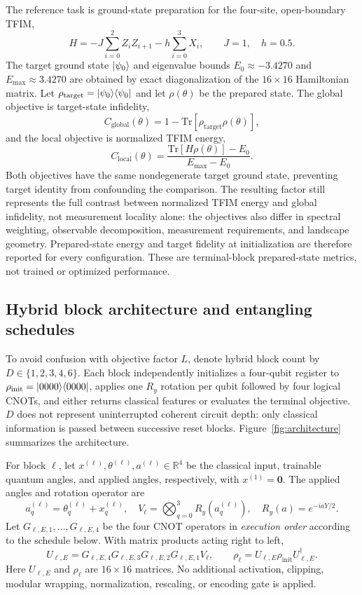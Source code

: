 \documentclass[pdflatex,sn-mathphys-num,Numbered]{sn-jnl}
\begin{document}
The reference task is ground-state preparation for the four-site, open-boundary TFIM,
\[
H=-J\sum_{i=0}^{2}Z_i Z_{i+1}-h\sum_{i=0}^{3}X_i,
\qquad J=1,\quad h=0.5.
\]
The target ground state $\ket{\psi_0}$ and eigenvalue bounds $E_0\approx-3.4270$ and $E_{\max}\approx3.4270$ are obtained by exact diagonalization of the $16\times16$ Hamiltonian matrix. Let $\rho_{\mathrm{target}}=\ket{\psi_0}\!\bra{\psi_0}$ and let $\rho(\theta)$ be the prepared state. The global objective is target-state infidelity,
\[
C_{\mathrm{global}}(\theta)
=1-\mathrm{Tr}[\rho_{\mathrm{target}}\rho(\theta)],
\]
and the local objective is normalized TFIM energy,
\[
C_{\mathrm{local}}(\theta)
=\frac{\mathrm{Tr}[H\rho(\theta)]-E_0}{E_{\max}-E_0}.
\]
Both objectives have the same nondegenerate target ground state, preventing target identity from confounding the comparison. The resulting factor still represents the full contrast between normalized TFIM energy and global infidelity, not measurement locality alone: the objectives also differ in spectral weighting, observable decomposition, measurement requirements, and landscape geometry. Prepared-state energy and target fidelity at initialization are therefore reported for every configuration. These are terminal-block prepared-state metrics, not trained or optimized performance.

\subsection{Hybrid block architecture and entangling schedules}
\label{sec:ansatz}

To avoid confusion with objective factor $L$, denote hybrid block count by $D\in\{1,2,3,4,6\}$. Each block independently initializes a four-qubit register to $\rho_{\mathrm{init}}=\ket{0000}\!\bra{0000}$, applies one $R_y$ rotation per qubit followed by four logical CNOTs, and either returns classical features or evaluates the terminal objective. $D$ does not represent uninterrupted coherent circuit depth: only classical information is passed between successive reset blocks. Figure~\ref{fig:architecture} summarizes the architecture.

For block $\ell$, let $x^{(\ell)},\theta^{(\ell)},a^{(\ell)}\in\mathbb{R}^4$ be the classical input, trainable quantum angles, and applied angles, respectively, with $x^{(1)}=\mathbf{0}$. The applied angles and rotation operator are
\begin{equation}\label{eq:angles}
 a_q^{(\ell)}=\theta_q^{(\ell)}+x_q^{(\ell)},\quad
 V_\ell=\bigotimes_{q=0}^3 R_y(a_q^{(\ell)}),\quad
 R_y(a)=e^{-iaY/2}.
\end{equation}
Let $G_{\ell,E,1},\ldots,G_{\ell,E,4}$ be the four CNOT operators in \emph{execution order} according to the schedule below. With matrix products acting right to left,
\begin{equation}\label{eq:unitary}
 U_{\ell,E}=G_{\ell,E,4}G_{\ell,E,3}G_{\ell,E,2}G_{\ell,E,1}V_\ell,\qquad
 \rho_\ell=U_{\ell,E}\rho_{\mathrm{init}}U_{\ell,E}^{\dagger}.
\end{equation}
Here $U_{\ell,E}$ and $\rho_\ell$ are $16\times16$ matrices. No additional activation, clipping, modular wrapping, normalization, rescaling, or encoding gate is applied.
\end{document}

